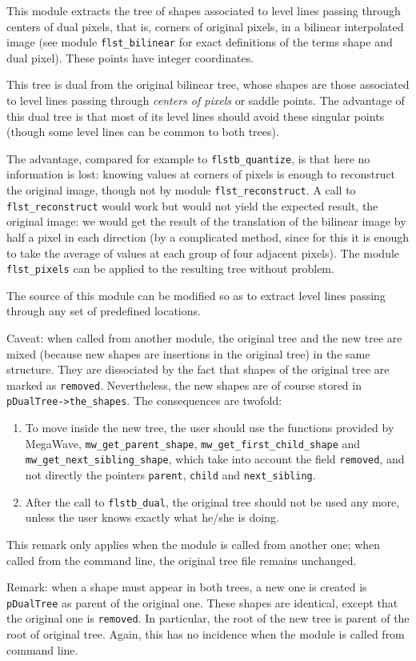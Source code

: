 This module extracts the tree of shapes associated to level lines passing
through centers of dual pixels, that is, corners of original pixels, in a
bilinear interpolated image (see module \verb+flst_bilinear+ for exact
definitions of the terms shape and dual pixel). These points have integer
coordinates.

This tree is dual from the original bilinear tree, whose shapes are those
associated to level lines passing through {\em centers of pixels} or saddle
points. The advantage of this dual tree is that most of its level lines should
avoid these singular points (though some level lines can be common to both
trees).

The advantage, compared for example to \verb+flstb_quantize+, is that here
no information is lost: knowing values at corners of pixels is enough to
reconstruct the original image, though not by module
\verb+flst_reconstruct+. A call to \verb+flst_reconstruct+ would work but
would not yield the expected result, the original image: we would get the
result of the translation of the bilinear image by half a pixel in each
direction (by a complicated method, since for this it is enough to take the
average of values at each group of four adjacent pixels). The module
\verb+flst_pixels+ can be applied to the resulting tree without problem.

The source of this module can be modified so as to extract level lines passing
through any set of predefined locations.

Caveat: when called from another module, the original tree and the new tree
are mixed (because new shapes are insertions in the original tree) in the same
structure. They are dissociated by the fact that shapes of the original tree
are marked as \verb+removed+. Nevertheless, the new shapes are of course
stored in \verb+pDualTree->the_shapes+. The consequences are twofold:
\begin{enumerate}
\item To move inside the new tree, the user should use the functions provided
by MegaWave, \verb+mw_get_parent_shape+, \verb+mw_get_first_child_shape+
and \verb+mw_get_next_sibling_shape+, which take into account the field
\verb+removed+, and not directly the pointers \verb+parent+,
\verb+child+ and \verb+next_sibling+.
\item After the call to \verb+flstb_dual+, the original tree should not be
used any more, unless the user knows exactly what he/she is doing.
\end{enumerate}
This remark only applies when the module is called from another one; when
called from the command line, the original tree file remains unchanged.

Remark: when a shape must appear in both trees, a new one is created is
\verb+pDualTree+ as parent of the original one. These shapes are identical,
except that the original one is \verb+removed+. In particular, the root of
the new tree is parent of the root of original tree. Again, this has no
incidence when the module is called from command line.
